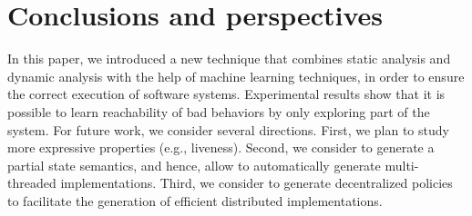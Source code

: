 \section{Conclusions and perspectives}
\label{sec:conclusion}
In this paper, we introduced a new technique that combines static analysis and dynamic analysis with the help of machine learning techniques, in order to ensure the correct execution of software systems. 
Experimental results show that it is possible to learn reachability of bad behaviors by only exploring part of the system. 
For future work, we consider several directions. 
First, we plan to study more expressive properties (e.g., liveness). Second, we consider to generate a partial state semantics, and hence, allow to automatically generate multi-threaded implementations. Third, we consider to generate decentralized policies to facilitate the generation of efficient distributed implementations. 